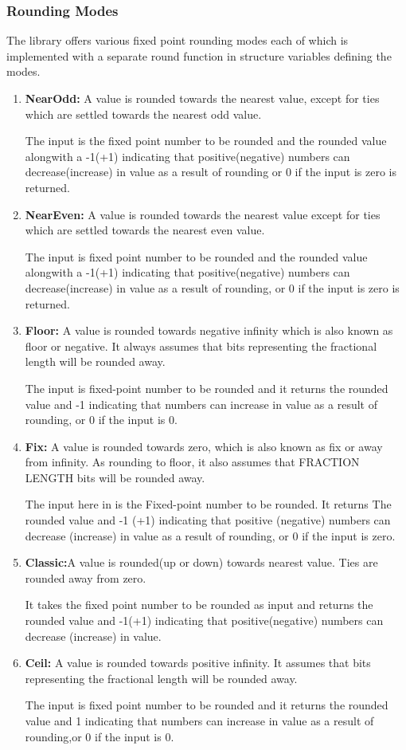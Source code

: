 \subsubsection{Rounding Modes}\label{Rounding Modes Section}
The library offers various fixed point rounding modes each of which is implemented with a separate round function in structure variables defining the modes.
\begin{enumerate}
\item
\textbf{NearOdd:} A value is rounded towards the nearest value, except for ties which are settled towards the nearest odd value.

\noindent The input is the fixed point number to be rounded and the rounded value alongwith a -1(+1) indicating that positive(negative) numbers can decrease(increase) in value as a result of rounding or 0 if the input is zero is returned.
\item
\textbf{NearEven:} A value is rounded towards the nearest value except for ties which are settled towards the nearest even value.

\noindent The input is fixed point number to be rounded and the rounded value alongwith a -1(+1) indicating that positive(negative) numbers can decrease(increase) in value as a result of rounding, or 0 if the input is zero is returned.
\item
\textbf{Floor:} A value is rounded towards negative infinity which  is also known as floor or negative. It always assumes that bits representing the fractional length will be rounded away.

\noindent The input is fixed-point number to be rounded and it returns the rounded value and -1 indicating that numbers can increase in value as a result of rounding, or 0 if the input is 0.
\item
\textbf{Fix:} A value is rounded towards zero, which is also known as fix or away from infinity. As rounding to floor, it also assumes that FRACTION LENGTH bits will be rounded away.

\noindent The input here in is the Fixed-point number to be rounded. It returns The rounded value and -1 (+1) indicating that positive (negative) numbers can decrease (increase) in value as a result of rounding, or 0 if the input is zero.	
\item
\textbf{Classic:}A value is rounded(up or down) towards nearest value. Ties are rounded away from zero.

\noindent It takes the fixed point number to be rounded as input and returns the rounded value and -1(+1) indicating that positive(negative) numbers can decrease (increase) in value.

\item
\textbf{Ceil:} A value is rounded towards positive infinity. It assumes that bits representing the fractional length will be rounded away.

\noindent The input is fixed point number to be rounded and it returns the rounded value and 1 indicating that numbers can increase in value as a result of rounding,or 0 if the input is 0.
\end{enumerate}
